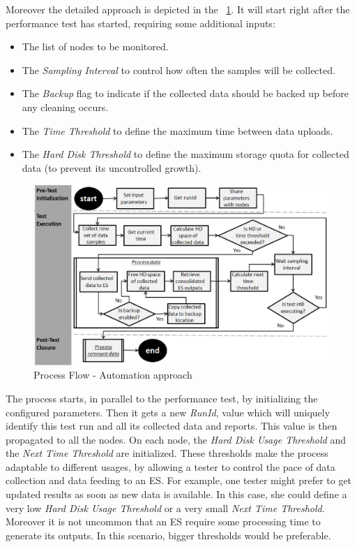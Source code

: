 \documentclass[runningheads,a4paper]{llncs}
\begin{document}
Moreover the detailed approach is depicted in the \figurename
~\ref{fig_ApproachDiagram}. It will start right after the performance
test has started, requiring some additional inputs: 
\vspace{-7pt}
\begin{itemize}
	\item The list of nodes to be monitored.
	\item The \emph{Sampling Interval} to control how often the samples will be
	collected.
	\item The \emph{Backup} flag to indicate if the collected data should be backed
	up before any cleaning occurs.
	\item The \emph{Time Threshold} to define the maximum time between data
	uploads.
	\item The \emph{Hard Disk Threshold} to define the maximum storage quota for
	collected data (to prevent its uncontrolled growth).
\end{itemize}

\begin{figure}[!h]
\centering
\includegraphics[width=1.0\textwidth]{ApproachDiagram}
\caption{Process Flow - Automation approach}
\label{fig_ApproachDiagram}
\end{figure}

The process starts, in parallel to the performance test, by initializing the
configured parameters. Then it gets a new \emph{RunId}, value which will
uniquely identify this test run and all its collected data and reports. This
value is then propagated to all the nodes. On each node, the \emph{Hard Disk
Usage Threshold} and  the \emph{Next Time Threshold} are initialized. These thresholds 
make the process adaptable to different usages, by allowing a tester to control
the pace of data collection and data feeding to an ES. For example, one tester might 
prefer to get updated results as soon as new data is available. In this case,
she could define a very low \emph{Hard Disk Usage Threshold} or a very small
\emph{Next Time Threshold}. Moreover it is not uncommon that an ES require some 
processing time to generate its outputs. In this scenario, bigger thresholds
would be preferable.
\end{document}
